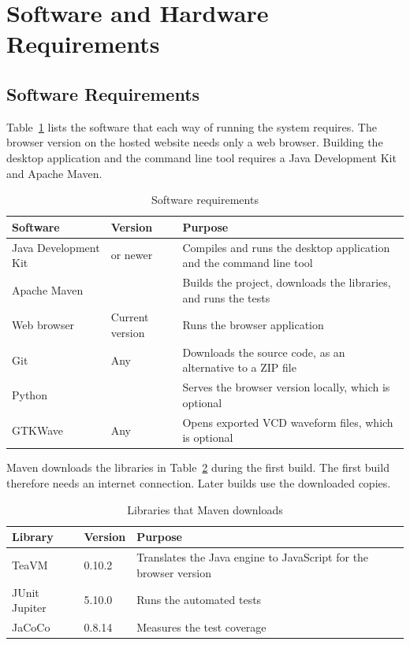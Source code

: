 \section{Software and Hardware Requirements}

\subsection{Software Requirements}

Table~\ref{tab:software} lists the software that each way of running the system requires.
The browser version on the hosted website needs only a web browser.
Building the desktop application and the command line tool requires a Java Development Kit and Apache Maven.

\begin{table}[H]
\centering
\small
\caption{Software requirements}
\label{tab:software}
\begin{tabular}{>{\raggedright\arraybackslash}p{4.2cm}>{\raggedright\arraybackslash}p{3.2cm}>{\raggedright\arraybackslash}p{7.4cm}}
\toprule
\textbf{Software} & \textbf{Version} & \textbf{Purpose} \\
\midrule
Java Development Kit & 21 or newer & Compiles and runs the desktop application and the command line tool \\
Apache Maven & 3 & Builds the project, downloads the libraries, and runs the tests \\
Web browser & Current version & Runs the browser application \\
Git & Any & Downloads the source code, as an alternative to a ZIP file \\
Python & 3 & Serves the browser version locally, which is optional \\
GTKWave & Any & Opens exported VCD waveform files, which is optional \\
\bottomrule
\end{tabular}
\end{table}

Maven downloads the libraries in Table~\ref{tab:libraries} during the first build.
The first build therefore needs an internet connection.
Later builds use the downloaded copies.

\begin{table}[H]
\centering
\small
\caption{Libraries that Maven downloads}
\label{tab:libraries}
\begin{tabular}{llp{8.2cm}}
\toprule
\textbf{Library} & \textbf{Version} & \textbf{Purpose} \\
\midrule
TeaVM & 0.10.2 & Translates the Java engine to JavaScript for the browser version \\
JUnit Jupiter & 5.10.0 & Runs the automated tests \\
JaCoCo & 0.8.14 & Measures the test coverage \\
\bottomrule
\end{tabular}
\end{table}

